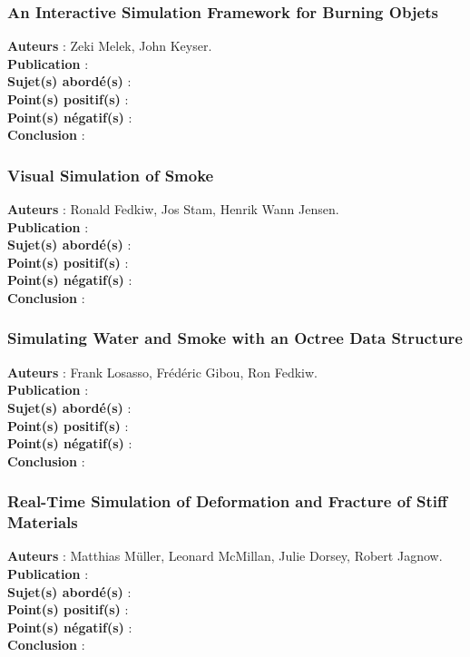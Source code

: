 \documentclass[a4paper,10pt]{article}
\begin{document}
\subsubsection{An Interactive Simulation Framework for Burning Objets}
\textbf{Auteurs} : Zeki Melek, John Keyser.\\
\textbf{Publication} :\\
\textbf{Sujet(s) abordé(s)} : \\
\textbf{Point(s) positif(s)} :\\
\textbf{Point(s) négatif(s)} :\\
\textbf{Conclusion} :\\


\subsubsection{Visual Simulation of Smoke}
\textbf{Auteurs} : Ronald Fedkiw, Jos Stam, Henrik Wann Jensen.\\
\textbf{Publication} :\\
\textbf{Sujet(s) abordé(s)} : \\
\textbf{Point(s) positif(s)} :\\
\textbf{Point(s) négatif(s)} :\\
\textbf{Conclusion} :\\

\subsubsection{Simulating Water and Smoke with an Octree Data Structure}
\textbf{Auteurs} : Frank Losasso, Frédéric Gibou, Ron Fedkiw.\\
\textbf{Publication} :\\
\textbf{Sujet(s) abordé(s)} : \\
\textbf{Point(s) positif(s)} :\\
\textbf{Point(s) négatif(s)} :\\
\textbf{Conclusion} :\\



\subsubsection{Real-Time Simulation of Deformation and Fracture of Stiff Materials}
\textbf{Auteurs} : Matthias Müller, Leonard McMillan, Julie Dorsey, Robert Jagnow.\\
\textbf{Publication} :\\
\textbf{Sujet(s) abordé(s)} : \\
\textbf{Point(s) positif(s)} :\\
\textbf{Point(s) négatif(s)} :\\
\textbf{Conclusion} :\\
\end{document}
